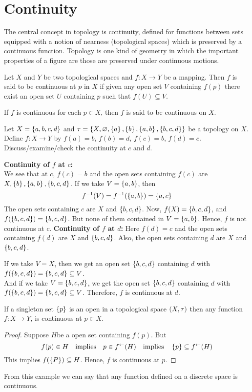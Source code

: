 \documentclass[../main-sheet.tex]{subfiles}
\begin{document}
\chapter{Continuity}
The central concept in topology is continuity, defined for functions between sets equipped with a notion of nearness (topological spaces) which is preserved by a continuous function. Topology is one kind of geometry in which the important properties of a figure are those are preserved under continuous motions.
\begin{defn}
    Let \(X\) and \(Y\) be two topological spaces and \(f:X\to Y\) be a mapping. Then \(f\) is said to be continuous at \(p\) in \(X\) if given any open set \(V\) containing \(f(p)\) there exist an open set \(U\) containing \(p\) such that \(f(U)\subseteq V\).

    If \(f\) is continuous for each \(p \in X\), then \(f\) is said to be continuous on \(X\).
\end{defn}
\begin{ex}
    Let \(X=\left\{a,b,c,d\right\}\) and \(\tau =\left\{X,\varnothing,\left\{a\right\},\left\{b\right\},\left\{a,b\right\},\left\{b,c,d\right\}\right\}\) be a topology on \(X\). Define \(f:X\to Y\) by \(f(a)=b\), \(f(b)=d\), \(f(c)=b\), \(f(d)=c\). Discuss/examine/check the continuity at \(c\) and \(d\).
\end{ex}
\begin{soln}
    \textbf{Continuity of \(f\) at \(c\):}\\
    We see that at \(c\), \(f(c)=b\) and the open sets containing \(f(c)\) are \(X,\left\{b\right\},\left\{a,b\right\},\left\{b,c,d\right\}\). If we take \(V=\left\{a,b\right\}\), then
    \[f^{-1}(V)=f^{-1}(\left\{a,b\right\})=\left\{a,c\right\}\]
    The open sets containing \(c\) are \(X\) and \(\left\{b,c,d\right\}\). Now, \(f(X)=\left\{b,c,d\right\}\), and \(f(\left\{b,c,d\right\})=\left\{b,c,d\right\}\). But none of them contained in \(V=\left\{a,b\right\}\). Hence, \(f\) is not continuous at \(c\).
    \textbf{Continuity of \(f\) at \(d\):} Here \(f(d)=c\) and the open sets containing \(f(d)\) are \(X\) and \(\left\{b,c,d\right\}\). Also, the open sets containing \(d\) are \(X\) and \(\left\{b,c,d\right\}\).

    If we take \(V=X\), then we get an open set \(\left\{b,c,d\right\}\) containing \(d\) with \(f(\left\{b,c,d\right\})=\left\{b,c,d\right\}\subseteq V\).\\
    And if we take \(V=\left\{{b,c,d}\right\}\), we get the open set \(\left\{b,c,d\right\} \) containing \(d\) with \(f(\left\{b,c,d\right\})=\left\{b,c,d\right\}\subseteq V \). Therefore, \(f\) is continuous at \(d\).
\end{soln}
\begin{ex}
    If a  singleton set \(\left\{p\right\} \) is an open in a topological space \((X, \tau)\) then any function \(f:X\to Y\), is continuous at \(p\in X\).
\end{ex}
\begin{proof}
    Suppose \(H\)be a open set containing \(f(p)\). But
    \[f(p)\in H \quad\text{implies}\quad p\in f^{\leftarrow}(H) \quad\text{implies}\quad \left\{p\right\}\subseteq f^{\leftarrow}(H)\]
    This implies \(f(\left\{P\right\})\subseteq H\). Hence, \(f\) is continuous at \(p\).
\end{proof}
From this example we can say that any function defined on a discrete space is continuous.
\end{document}
